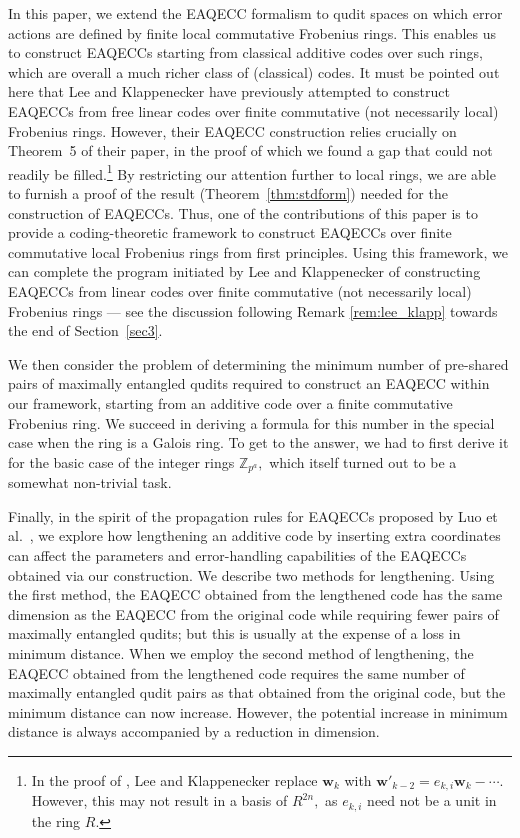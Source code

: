 \documentclass{article}
\def\Z{\mathbb{Z}}
\theoremstyle{remark}
\theoremstyle{definition}
\numberwithin{equation}{section}
\begin{document}
In this paper, we extend the EAQECC formalism to qudit spaces on which error actions are defined by finite local commutative Frobenius rings. This enables us to construct EAQECCs starting from classical additive codes over such rings, which are overall a much richer class of (classical) codes. It must be pointed out here that Lee and Klappenecker \cite{lee} have previously attempted to construct EAQECCs from free linear codes over finite commutative (not necessarily local) Frobenius rings. However, their EAQECC construction relies crucially on Theorem~5 of their paper, in the proof of which we found a gap that could not readily be filled.\footnote{In the proof of \cite[Theorem 5]{lee}, Lee and Klappenecker replace $\mathbf{w}_k$ with $\mathbf{w}'_{k-2} = e_{k,i} \mathbf{w}_k - \cdots $. However, this may not result in a basis of $R^{2n},$ as $e_{k,i}$ need not be a unit in the ring $R$.}  By restricting our attention further to local rings, we are able to furnish a proof of the result (Theorem~\ref{thm:stdform}) needed for the construction of EAQECCs. Thus, one of the contributions of this paper is to provide a coding-theoretic framework to construct EAQECCs over finite commutative local Frobenius rings from first principles. Using this framework, we can complete the program initiated by Lee and Klappenecker \cite{lee} of constructing EAQECCs from linear codes over finite commutative (not necessarily local) Frobenius rings --- see the discussion following Remark \ref{rem:lee_klapp} towards the end of Section~\ref{sec3}.

We then consider the problem of determining the minimum number of pre-shared pairs of maximally entangled qudits required to construct an EAQECC within our framework, starting from an additive code over a finite commutative Frobenius ring. We succeed in deriving a formula for this number in the special case when the ring is a Galois ring. To get to the answer, we had to first derive it for the basic case of the integer rings $\Z_{p^a},$ which itself turned out to be a somewhat non-trivial task.

Finally, in the spirit of the propagation rules for EAQECCs proposed by Luo et al.\ \cite[Theorems~16 and 18]{luo1}, we explore how lengthening an additive code by inserting extra coordinates can affect the parameters and error-handling capabilities of the EAQECCs obtained via our construction. We describe two methods for lengthening. Using the first method, the EAQECC obtained from the lengthened code has the same dimension as the EAQECC from the original code while requiring fewer pairs of maximally entangled qudits; but this is usually at the expense of a loss in minimum distance. When we employ the second method of lengthening, the EAQECC obtained from the lengthened code requires the same number of maximally entangled qudit pairs as that obtained from the original code, but the minimum distance can now increase. However, the potential increase in minimum distance is always accompanied by a reduction in dimension. 
\end{document}
